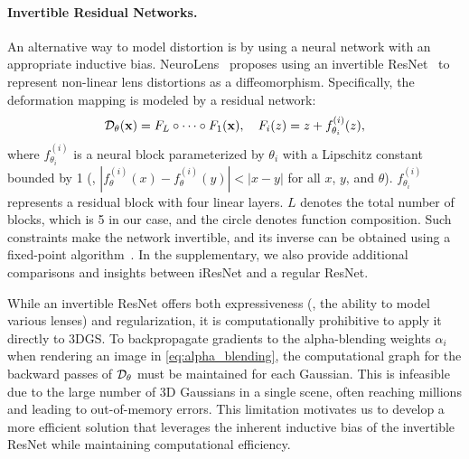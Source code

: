 \paragraph{Invertible Residual Networks.} An alternative way to model distortion is by using a neural network with an appropriate inductive bias.
NeuroLens~\cite{xian2023neural} proposes using an invertible ResNet~\cite{behrmann2019invertible} to represent non-linear lens distortions as a diffeomorphism.
Specifically, the deformation mapping is modeled by a residual network:
\begin{align}
\label{eq:invert}
    \mathcal{D}_\theta(\textbf{x}) = F_L \circ \cdots \circ F_1(\textbf{x}), \quad F_i(z) = z + f^{(i)}_{\theta_i}(z), 
\end{align}
where $f^{(i)}_{\theta_i}$ is a neural block parameterized by $\theta_i$ with a Lipschitz constant bounded by 1 (\ie, $|f^{(i)}_\theta(x) - f^{(i)}_\theta(y)| < |x-y|$ for all $x$, $y$, and $\theta$). $f^{(i)}_{\theta_i}$ represents a residual block with four linear layers. $L$ denotes the total number of blocks, which is 5 in our case, and the circle denotes function composition.
Such constraints make the network invertible, and its inverse can be obtained using a fixed-point algorithm~\cite{behrmann2019invertible}. In the supplementary, we also provide additional comparisons and insights between iResNet and a regular ResNet.

While an invertible ResNet offers both expressiveness (\ie, the ability to model various lenses) and regularization, it is computationally prohibitive to apply it directly to 3DGS. 
To backpropagate gradients to the alpha-blending weights $\alpha_i$ when rendering an image in \cref{eq:alpha_blending}, the computational graph for the backward passes of $\mathcal{D}_\theta$ must be maintained for each Gaussian. This is infeasible due to the large number of 3D Gaussians in a single scene, often reaching millions and leading to out-of-memory errors.
This limitation motivates us to develop a more efficient solution that leverages the inherent inductive bias of the invertible ResNet while maintaining computational efficiency.



